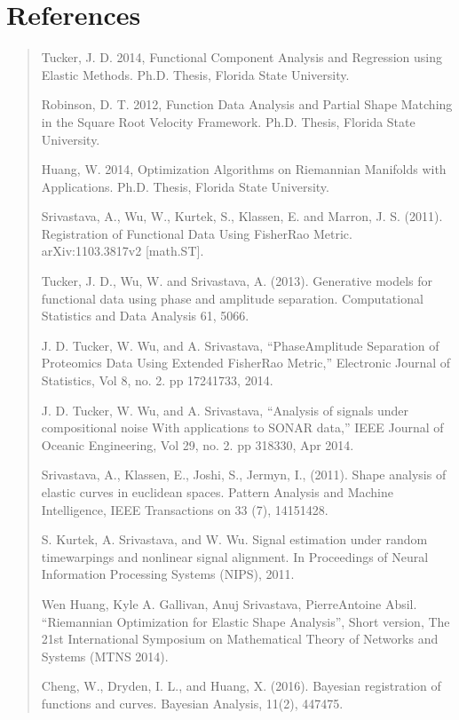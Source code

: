 \documentclass[letterpaper,10pt,english]{sphinxmanual}
\begin{document}
\chapter{References}
\label{\detokenize{index:references}}\begin{quote}

Tucker, J. D. 2014, Functional Component Analysis and Regression using Elastic
Methods. Ph.D. Thesis, Florida State University.

Robinson, D. T. 2012, Function Data Analysis and Partial Shape Matching in the
Square Root Velocity Framework. Ph.D. Thesis, Florida State University.

Huang, W. 2014, Optimization Algorithms on Riemannian Manifolds with
Applications. Ph.D. Thesis, Florida State University.

Srivastava, A., Wu, W., Kurtek, S., Klassen, E. and Marron, J. S. (2011).
Registration of Functional Data Using Fisher\sphinxhyphen{}Rao Metric. arXiv:1103.3817v2
{[}math.ST{]}.

Tucker, J. D., Wu, W. and Srivastava, A. (2013). Generative models for
functional data using phase and amplitude separation. Computational Statistics
and Data Analysis 61, 50\sphinxhyphen{}66.

J. D. Tucker, W. Wu, and A. Srivastava, “Phase\sphinxhyphen{}Amplitude Separation of
Proteomics Data Using Extended Fisher\sphinxhyphen{}Rao Metric,” Electronic Journal of
Statistics, Vol 8, no. 2. pp 1724\sphinxhyphen{}1733, 2014.

J. D. Tucker, W. Wu, and A. Srivastava, “Analysis of signals under compositional
noise With applications to SONAR data,” IEEE Journal of Oceanic Engineering, Vol
29, no. 2. pp 318\sphinxhyphen{}330, Apr 2014.

Srivastava, A., Klassen, E., Joshi, S., Jermyn, I., (2011). Shape analysis of
elastic curves in euclidean spaces. Pattern Analysis and Machine Intelligence,
IEEE Transactions on 33 (7), 1415\sphinxhyphen{}1428.

S. Kurtek, A. Srivastava, and W. Wu. Signal estimation under random
time\sphinxhyphen{}warpings and nonlinear signal alignment. In Proceedings of Neural
Information Processing Systems (NIPS), 2011.

Wen Huang, Kyle A. Gallivan, Anuj Srivastava, Pierre\sphinxhyphen{}Antoine Absil. “Riemannian
Optimization for Elastic Shape Analysis”, Short version, The 21st International
Symposium on Mathematical Theory of Networks and Systems (MTNS 2014).

Cheng, W., Dryden, I. L., and Huang, X. (2016). Bayesian registration of functions
and curves. Bayesian Analysis, 11(2), 447\sphinxhyphen{}475.


\end{quote}
\end{document}
